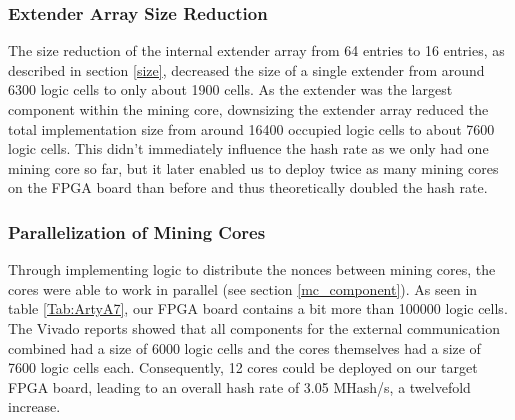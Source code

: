 \subsubsection*{Extender Array Size Reduction}
The size reduction of the internal extender array from 64 entries to 16 entries, as described in section \ref{size}, decreased the size of a single extender from around 6300 logic cells to only about 1900 cells. As the extender was the largest component within the mining core, downsizing the extender array reduced the total implementation size from around 16400 occupied logic cells to about 7600 logic cells. This didn't immediately influence the hash rate as we only had one mining core so far, but it later enabled us to deploy twice as many mining cores on the FPGA board than before and thus theoretically doubled the hash rate.

\subsubsection*{Parallelization of Mining Cores}
Through implementing logic to distribute the nonces between mining cores, the cores were able to work in parallel (see section \ref{mc_component}). As seen in table \ref{Tab:ArtyA7}, our FPGA board contains a bit more than 100000 logic cells. The Vivado reports showed that all components for the external communication combined had a size of 6000 logic cells and the cores themselves had a size of 7600 logic cells each. Consequently, 12 cores could be deployed on our target FPGA board, leading to an overall hash rate of 3.05 MHash/s, a twelvefold increase.


